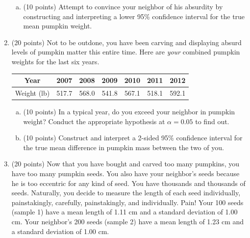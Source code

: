\documentclass{article}\usepackage{graphicx, color}
\numberwithin{equation}{section}
\begin{document}
\begin{flushleft}
\begin{enumerate}[1. ]
\begin{enumerate}[a. ]
\item (10 points) Attempt to convince your neighbor of his absurdity by constructing and interpreting a lower 95\% confidence interval for the true mean pumpkin weight.




\end{enumerate}


\item (20 points) Not to be outdone, you have been carving and displaying absurd levels of pumpkin matter this entire time. Here are \emph{your} combined pumpkin weights for the last six years.

\begin{center}
\begin{tabular}{c|cccccc}
Year & 2007 & 2008 & 2009 & 2010 & 2011 & 2012 \\ \hline
Weight (lb) & 517.7 & 568.0 & 541.8 & 567.1 & 518.1 & 592.1   \\ 
\end{tabular}
\end{center}

\begin{enumerate}[a. ]
\item (10 points) In a typical year, do you exceed your neighbor in pumpkin weight? Conduct the appropriate hypothesis at $\alpha = 0.05$ to find out.



\item (10 points) Construct and interpret a 2-sided 95\% confidence interval for the true mean difference in pumpkin mass between the two of you.



\end{enumerate}







\item (20 points) Now that you have bought and carved too many pumpkins, you have too many pumpkin seeds. You also have your neighbor's seeds because he is too eccentric for any kind of seed. You have thousands and thousands of seeds. Naturally, you decide to measure the length of each seed individually, painstakingly, carefully, painstakingly, and individually. Pain! Your 100 seeds (sample 1) have a mean length of 1.11 cm and a standard deviation of 1.00 cm. Your neighbor's 200 seeds (sample 2) have a mean length of 1.23 cm and a standard deviation of 1.00 cm. 


\end{enumerate}
\end{flushleft}
\end{document}
